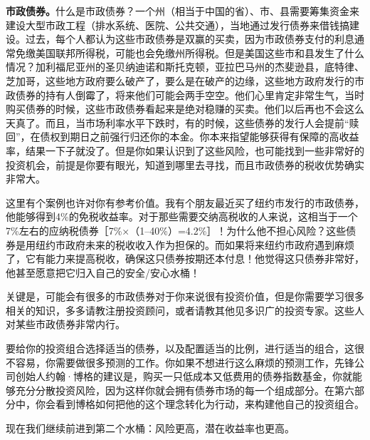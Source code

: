\textbf{市政债券。}什么是市政债券？一个州（相当于中国的省）、市、县需要筹集资金来建设大型市政工程（排水系统、医院、公共交通），当地通过发行债券来借钱搞建设。过去，每个人都认为这些市政债券是双赢的买卖，因为市政债券支付的利息通常免缴美国联邦所得税，可能也会免缴州所得税。但是美国这些市和县发生了什么情况？加利福尼亚州的圣贝纳迪诺和斯托克顿，亚拉巴马州的杰斐逊县，底特律、芝加哥，这些地方政府要么破产了，要么是在破产的边缘，这些地方政府发行的市政债券的持有人倒霉了，将来他们可能会两手空空。他们心里肯定非常生气，当时购买债券的时候，这些市政债券看起来是绝对稳赚的买卖。他们以后再也不会这么天真了。而且，当市场利率水平下跌时，有的时候，这些债券的发行人会提前“赎回”，在债权到期日之前强行归还你的本金。你本来指望能够获得有保障的高收益率，结果一下子就没了。但是你如果认识到了这些风险，也可能找到一些非常好的投资机会，前提是你要有眼光，知道到哪里去寻找，而且市政债券的税收优势确实非常大。

这里有个案例也许对你有参考价值。我有个朋友最近买了纽约市发行的市政债券，他能够得到4\%的免税收益率。对于那些需要交纳高税收的人来说，这相当于一个7\%左右的应纳税债券［7\%×（1–40\%）=4.2\%］！为什么他不担心风险？这些债券是用纽约市政府未来的税收收入作为担保的。而如果将来纽约市政府遇到麻烦了，它有能力来提高税收，确保这只债券按期还本付息！他觉得这只债券非常好，他甚至愿意把它归入自己的安全/安心水桶！

关键是，可能会有很多的市政债券对于你来说很有投资价值，但是你需要学习很多相关的知识，多多请教注册投资顾问，或者请教其他见多识广的投资专家。这些人对某些市政债券非常内行。

要给你的投资组合选择适当的债券，以及配置适当的比例，进行适当的组合，这很不容易，你需要做很多预测的工作。你如果不想进行这么麻烦的预测工作，先锋公司创始人约翰·博格的建议是，购买一只低成本又低费用的债券指数基金，你就能够充分分散投资风险，因为这样你就会拥有债券市场的每一个组成部分。在第六部分中，你会看到博格如何把他的这个理念转化为行动，来构建他自己的投资组合。

现在我们继续前进到第二个水桶：风险更高，潜在收益率也更高。
